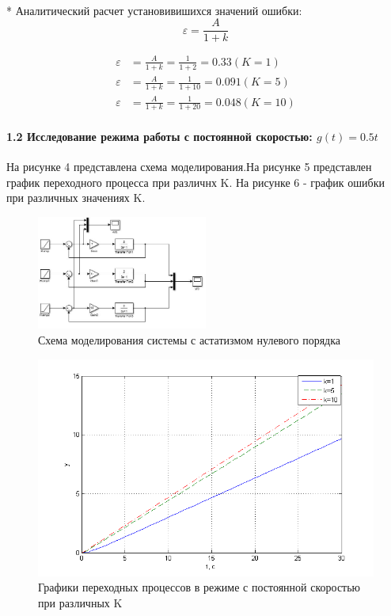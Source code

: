 \documentclass[a4paper, 12pt]{article}
\begin{document}
\hfill\\*
Аналитический расчет установивишихся значений ошибки:
\begin{equation}
\varepsilon=\frac{A}{1+k}
\end{equation}

\begin{align}
\varepsilon &=\frac{A}{1+k} =\frac{1}{1+2}=0.33 (K=1 ) \\
\varepsilon &=\frac{A}{1+k} =\frac{1}{1+10}=0.091 (K=5 ) \\
\varepsilon &=\frac{A}{1+k} =\frac{1}{1+20}=0.048 (K=10 )
\end{align}
\par
\paragraph{1.2 Исследование режима работы с постоянной скоростью: $g(t) = 0.5t$ }\hfill\par
На рисунке 4 представлена схема моделирования.На рисунке 5 представлен график переходного процесса при различнх K. На рисунке 6 - график ошибки при различных значениях K.
\begin{figure}[H]
	\centering
	\includegraphics[width = 0.5\textwidth]{sxema2}
	\caption{Схема моделирования системы с астатизмом нулевого порядка}
\end{figure}
\begin{figure}[h]
	\centering
	\includegraphics[width = 1\textwidth]{hinh4}
	\caption{Графики переходных процессов в режиме с постоянной скоростью при различных K}
\end{figure}
\end{document}
